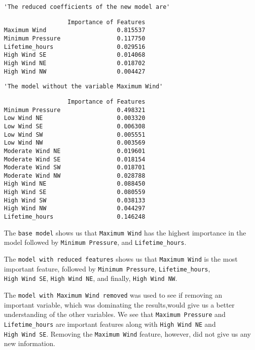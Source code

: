 \documentclass[11pt]{article}
\begin{document}
    
    
    \begin{verbatim}
'The reduced coefficients of the new model are'
    \end{verbatim}

    
    
    \begin{verbatim}
                  Importance of Features
Maximum Wind                    0.815537
Minimum Pressure                0.117750
Lifetime_hours                  0.029516
High Wind SE                    0.014068
High Wind NE                    0.018702
High Wind NW                    0.004427
    \end{verbatim}

    
    
    \begin{verbatim}
'The model without the variable Maximum Wind'
    \end{verbatim}

    
    
    \begin{verbatim}
                  Importance of Features
Minimum Pressure                0.498321
Low Wind NE                     0.003320
Low Wind SE                     0.006308
Low Wind SW                     0.005551
Low Wind NW                     0.003569
Moderate Wind NE                0.019601
Moderate Wind SE                0.018154
Moderate Wind SW                0.018701
Moderate Wind NW                0.028788
High Wind NE                    0.088450
High Wind SE                    0.080559
High Wind SW                    0.038133
High Wind NW                    0.044297
Lifetime_hours                  0.146248
    \end{verbatim}

    
    The \texttt{base\ model} shows us that \texttt{Maximum\ Wind} has the
highest importance in the model followed by \texttt{Minimum\ Pressure},
and \texttt{Lifetime\_hours}.

The \texttt{model\ with\ reduced\ features} shows us that
\texttt{Maximum\ Wind} is the most important feature, followed by
\texttt{Minimum\ Pressure}, \texttt{Lifetime\_hours},
\texttt{High\ Wind\ SE}, \texttt{High\ Wind\ NE}, and finally,
\texttt{High\ Wind\ NW}.

The \texttt{model\ with\ Maximum\ Wind\ removed} was used to see if
removing an important variable, which was dominating the results,would
give us a better understanding of the other variables. We see that
\texttt{Maximum\ Pressure} and \texttt{Lifetime\_hours} are important
features along with \texttt{High\ Wind\ NE} and \texttt{High\ Wind\ SE}.
Removing the \texttt{Maximum\ Wind} feature, however, did not give us
any new information.
\end{document}

